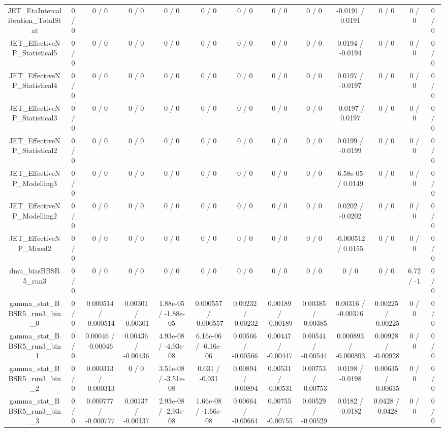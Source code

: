 \documentclass[10pt]{article}
\begin{document}
\begin{table}[htbp]
\begin{center}
\begin{tabular}{|c|c|c|c|c|c|c|c|c|c|c|c|c|}
  JET_EtaIntercalibration_TotalStat & 0 / 0 & 0 / 0 & 0 / 0 & 0 / 0 & 0 / 0 & 0 / 0 & 0 / 0 & 0 / 0 & -0.0191 / 0.0191 & 0 / 0 & 0 / 0 & 0 / 0 \\ 
  JET_EffectiveNP_Statistical5 & 0 / 0 & 0 / 0 & 0 / 0 & 0 / 0 & 0 / 0 & 0 / 0 & 0 / 0 & 0 / 0 & 0.0194 / -0.0194 & 0 / 0 & 0 / 0 & 0 / 0 \\ 
  JET_EffectiveNP_Statistical4 & 0 / 0 & 0 / 0 & 0 / 0 & 0 / 0 & 0 / 0 & 0 / 0 & 0 / 0 & 0 / 0 & 0.0197 / -0.0197 & 0 / 0 & 0 / 0 & 0 / 0 \\ 
  JET_EffectiveNP_Statistical3 & 0 / 0 & 0 / 0 & 0 / 0 & 0 / 0 & 0 / 0 & 0 / 0 & 0 / 0 & 0 / 0 & -0.0197 / 0.0197 & 0 / 0 & 0 / 0 & 0 / 0 \\ 
  JET_EffectiveNP_Statistical2 & 0 / 0 & 0 / 0 & 0 / 0 & 0 / 0 & 0 / 0 & 0 / 0 & 0 / 0 & 0 / 0 & 0.0199 / -0.0199 & 0 / 0 & 0 / 0 & 0 / 0 \\ 
  JET_EffectiveNP_Modelling3 & 0 / 0 & 0 / 0 & 0 / 0 & 0 / 0 & 0 / 0 & 0 / 0 & 0 / 0 & 0 / 0 & 6.58e-05 / 0.0149 & 0 / 0 & 0 / 0 & 0 / 0 \\ 
  JET_EffectiveNP_Modelling2 & 0 / 0 & 0 / 0 & 0 / 0 & 0 / 0 & 0 / 0 & 0 / 0 & 0 / 0 & 0 / 0 & 0.0202 / -0.0202 & 0 / 0 & 0 / 0 & 0 / 0 \\ 
  JET_EffectiveNP_Mixed2 & 0 / 0 & 0 / 0 & 0 / 0 & 0 / 0 & 0 / 0 & 0 / 0 & 0 / 0 & 0 / 0 & -0.000512 / 0.0155 & 0 / 0 & 0 / 0 & 0 / 0 \\ 
  dmu_biasBBSR5_run3 & 0 / 0 & 0 / 0 & 0 / 0 & 0 / 0 & 0 / 0 & 0 / 0 & 0 / 0 & 0 / 0 & 0 / 0 & 0 / 0 & 6.72 / -1 & 0 / 0 \\ 
  gamma_stat_BBSR5_run3_bin_0 & 0 / 0 & 0.000514 / -0.000514 & 0.00301 / -0.00301 & 1.88e-05 / -1.88e-05 & 0.000557 / -0.000557 & 0.00232 / -0.00232 & 0.00189 / -0.00189 & 0.00385 / -0.00385 & 0.00316 / -0.00316 & 0.00225 / -0.00225 & 0 / 0 & 0 / 0 \\ 
  gamma_stat_BBSR5_run3_bin_1 & 0 / 0 & 0.00046 / -0.00046 & 0.00436 / -0.00436 & 4.93e-08 / -4.93e-08 & 6.16e-06 / -6.16e-06 & 0.00566 / -0.00566 & 0.00447 / -0.00447 & 0.00544 / -0.00544 & 0.000893 / -0.000893 & 0.00928 / -0.00928 & 0 / 0 & 0 / 0 \\ 
  gamma_stat_BBSR5_run3_bin_2 & 0 / 0 & 0.000313 / -0.000313 & 0 / 0 & 3.51e-08 / -3.51e-08 & 0.031 / -0.031 & 0.00894 / -0.00894 & 0.00531 / -0.00531 & 0.00753 / -0.00753 & 0.0198 / -0.0198 & 0.00635 / -0.00635 & 0 / 0 & 0 / 0 \\ 
  gamma_stat_BBSR5_run3_bin_3 & 0 / 0 & 0.000777 / -0.000777 & 0.00137 / -0.00137 & 2.93e-08 / -2.93e-08 & 1.66e-08 / -1.66e-08 & 0.00664 / -0.00664 & 0.00755 / -0.00755 & 0.00529 / -0.00529 & 0.0182 / -0.0182 & 0.0428 / -0.0428 & 0 / 0 & 0 / 0 \\ 

\end{tabular}
\end{center}
\end{table}
\end{document}
